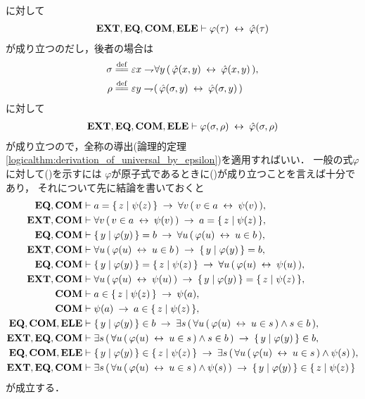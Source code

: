	に対して
	\begin{align}
		\EXTAX,\EQAX,\COMAX,\ELEAX \vdash \varphi(\tau) \lrarrow \hat{\varphi}(\tau)
	\end{align}
	が成り立つのだし，後者の場合は
	\begin{align}
		\sigma &\defeq \varepsilon x \negation \forall y\, (\, \hat{\varphi}(x,y) \lrarrow \hat{\varphi}(x,y)\, ), \\
		\rho &\defeq \varepsilon y \negation (\, \hat{\varphi}(\sigma,y) \lrarrow \hat{\varphi}(\sigma,y)\, )
	\end{align}
	に対して
	\begin{align}
		\EXTAX,\EQAX,\COMAX,\ELEAX \vdash \varphi(\sigma,\rho) \lrarrow \hat{\varphi}(\sigma,\rho)
	\end{align}
	が成り立つので，全称の導出(論理的定理\ref{logicalthm:derivation_of_universal_by_epsilon})を適用すればいい．
	一般の式$\varphi$に対して()を示すには
	$\varphi$が原子式であるときに()が成り立つことを言えば十分であり，
	それについて先に結論を書いておくと
	\begin{align}
		\EQAX,\COMAX &\vdash a = \Set{z}{\psi(z)} 
			\rarrow \forall v\, (\, v \in a \lrarrow \psi(v)\, ), \\
		\EXTAX,\COMAX &\vdash \forall v\, (\, v \in a \lrarrow \psi(v)\, )
			\rarrow a = \Set{z}{\psi(z)}, \\
		\EQAX,\COMAX &\vdash \Set{y}{\varphi(y)} = b 
			\rarrow \forall u\, (\, \varphi(u) \lrarrow u \in b\, ), \\
		\EXTAX,\COMAX &\vdash \forall u\, (\, \varphi(u) \lrarrow u \in b\, )
			\rarrow \Set{y}{\varphi(y)} = b, \\
		\EQAX,\COMAX &\vdash \Set{y}{\varphi(y)} = \Set{z}{\psi(z)}
			\rarrow \forall u\, (\, \varphi(u) \lrarrow \psi(u)\, ), \\
		\EXTAX,\COMAX &\vdash \forall u\, (\, \varphi(u) \lrarrow \psi(u)\, )
			\rarrow \Set{y}{\varphi(y)} = \Set{z}{\psi(z)}, \\
		\COMAX &\vdash a \in \Set{z}{\psi(z)} \rarrow \psi(a), \\
		\COMAX &\vdash \psi(a) \rarrow a \in \Set{z}{\psi(z)}, \\
		\EQAX,\COMAX,\ELEAX &\vdash \Set{y}{\varphi(y)} \in b
			\rarrow \exists s\, (\, \forall u\, (\, \varphi(u) \lrarrow u \in s\, ) \wedge s \in b\, ), \\
		\EXTAX,\EQAX,\COMAX &\vdash \exists s\, (\, \forall u\, (\, \varphi(u) \lrarrow u \in s\, ) \wedge s \in b\, ) \rarrow \Set{y}{\varphi(y)} \in b, \\
		\EQAX,\COMAX,\ELEAX &\vdash \Set{y}{\varphi(y)} \in \Set{z}{\psi(z)}
			\rarrow \exists s\, (\, \forall u\, (\, \varphi(u) \lrarrow u \in s\, ) \wedge \psi(s)\, ), \\
		\EXTAX,\EQAX,\COMAX &\vdash \exists s\, (\, \forall u\, (\, \varphi(u) \lrarrow u \in s\, ) \wedge \psi(s)\, ) \rarrow \Set{y}{\varphi(y)} \in \Set{z}{\psi(z)}
	\end{align}
	が成立する．
	
